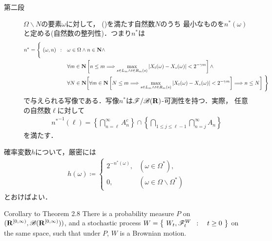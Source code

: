 \begin{prf}
\begin{description}
			\item[第二段]
				$\Omega \backslash N$の要素$\omega$に対して，
				()を満たす自然数$N$のうち
				最小なものを$n^*(\omega)$と定める(自然数の整列性)．つまり$n^*$は
		\begin{align}
			n^* = \Biggl\{\ (\omega,n)\ \, : \quad &\omega \in \Omega \wedge n \in \mathbf{N} \wedge \Biggr.\\
			&\forall m \in \mathbf{N}\left[n \leq m \Longrightarrow \operatorname*{max}_{s \in L_m \wedge t \in R_m(s)}
					|X_t(\omega) - X_s(\omega)| < 2^{-\gamma m}\right] \wedge \\
			&\forall N \in \mathbf{N}
			\Biggl. \left[\forall m \in \mathbf{N}\left[N \leq m \Longrightarrow \operatorname*{max}_{s \in L_m \wedge t \in R_m(s)}
					|X_t(\omega) - X_s(\omega)| < 2^{-\gamma m}\right] \Longrightarrow n \leq N\right]\ \Biggr\}
		\end{align}
		で与えられる写像である．写像$n^*$は$\mathscr{F}/\mathscr{B}(\mathbf{R})$-可測性を持つ．実際，
		任意の自然数$\ell$に対して
		\begin{align}
			{n^*}^{-1}(\ell) = \left\{ \bigcap_{n = \ell}^\infty A_n^c \right\} \cap \left\{ \bigcap_{1 \leq j \leq \ell-1} \bigcap_{n = j}^\infty A_n \right\}
		\end{align}
		を満たす．
		\end{description}
	\end{prf}
	
	
	
	確率変数$h$について，厳密には
	\begin{align}
		h(\omega) \coloneqq 
		\begin{cases}
			2^{-n^*(\omega)}, & (\omega \in \Omega^*), \\
			0, & (\omega \in \Omega \backslash \Omega^*)
		\end{cases}
	\end{align}
	とおけばよい．
	
	\begin{itembox}[l]{Corollary to Theorem 2.8}
		There is a probability measure $P$ on $(\mathbf{R}^{[0,\infty)},\mathscr{B}(\mathbf{R}^{[0,\infty)}))$,
		and a stochastic process $W = \left\{\ W_t,\mathscr{F}_t^W\ \, : \quad t \geq 0\ \right\}$ on the same space,
		such that under $P$, $W$ is a Brownian motion.
	\end{itembox}
	
